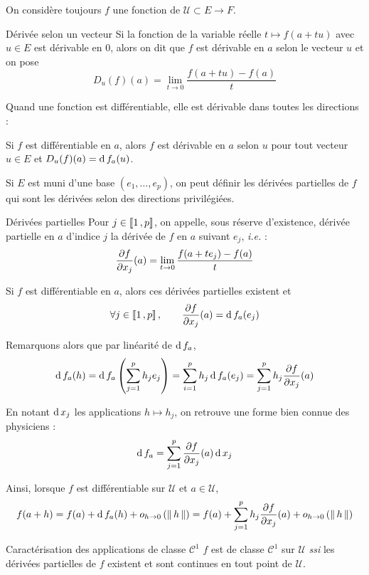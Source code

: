     On considère toujours $f$ une fonction de $\mathcal{U} \subset E \to F$.

    \begin{defi}{Dérivée selon un vecteur}{}
        Si la fonction de la variable réelle $t \mapsto f(a + tu)$ avec $u \in E$ est dérivable en 0, alors on dit que $f$ est dérivable en $a$ selon le vecteur $u$ et on pose 
        \[ D_u(f)(a) = \lim_{t \to 0} \frac{f(a + tu) - f(a)}{t} \]   
    \end{defi}

    Quand une fonction est différentiable, elle est dérivable dans toutes les directions :

    \begin{prop}{}{}
        Si $f$ est différentiable en $a$, alors $f$ est dérivable en $a$ selon $u$ pour tout vecteur $u \in E$  et $D_u(f)(a) = \operatorname{d} f_a(u)$. 
    \end{prop}

    Si $E$ est muni d’une base $(e_1,\ldots,e_p)$, on peut définir les dérivées partielles de $f$ qui sont les dérivées selon des directions privilégiées.

    \begin{defi}{Dérivées partielles}{}
        Pour $j \in \left\llbracket 1 \, , p \right\rrbracket$, on appelle, sous réserve d’existence, dérivée partielle en $a$ d’indice $j$ la dérivée de $f$ en $a$ suivant $e_j$, \textit{i.e.} : 
        \[ \frac{\partial f}{\partial x_j}(a) = \lim_{t \to 0} \frac{f(a + t e_j) - f(a)}{t} \]    
    \end{defi}

    Si $f$ est différentiable en $a$, alors ces dérivées partielles existent et 
    \[ \forall j \in \left\llbracket 1 \, , p \right\rrbracket, \qquad \frac{\partial f}{\partial x_j}(a) = \operatorname{d} f_a(e_j) \]    

    Remarquons alors que par linéarité de $\operatorname{d} f_a$, 
    \[ \operatorname{d} f_a(h) = \operatorname{d} f_a\left(\sum_{j=1}^{p} h_j e_j\right) = \sum_{i=1}^{p} h_j \operatorname{d} f_a(e_j) = \sum_{j=1}^{p} h_j \frac{\partial f}{\partial x_j}(a) \]    

    En notant $\operatorname{d} x_j$ les applications $h \mapsto h_j$, on retrouve une forme bien connue des physiciens : 
    \[ \operatorname{d} f_a = \sum_{j=1}^{p} \frac{\partial f}{\partial x_j}(a) \operatorname{d} x_j \]   
    
    Ainsi, lorsque $f$ est différentiable sur $\mathcal{U}$ et $a \in \mathcal{U}$,
    \[ f(a + h) = f(a) + \operatorname{d} f_a(h) + o_{h \rightarrow 0} \left(\left\lVert \,h \, \right\rVert\right) = f(a) + \sum_{j=1}^{p} h_j \frac{\partial f}{\partial x_j}(a) + o_{h \rightarrow 0} \left(\left\lVert \,h \, \right\rVert\right) \]    

    \begin{theo}{Caractérisation des applications de classe $\mathcal{C}^1$}{}
        $f$ est de classe $\mathcal{C}^1$ sur $\mathcal{U}$ \textit{ssi} les dérivées partielles de $f$ existent et sont continues en tout point de $\mathcal{U}$.
    \end{theo}


